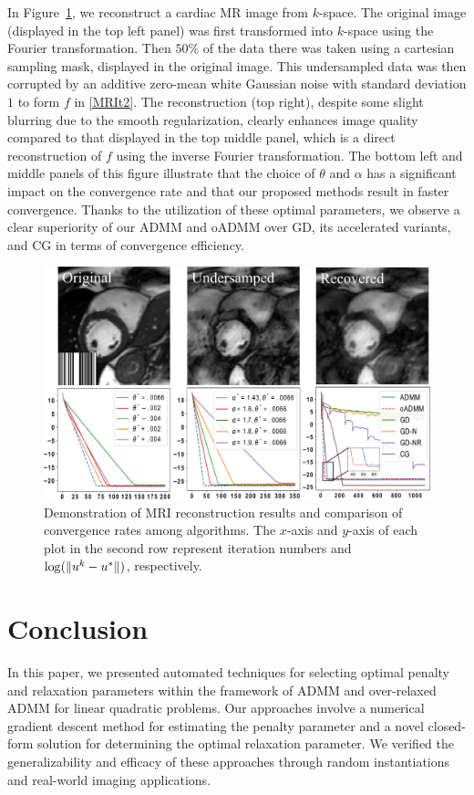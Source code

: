 \documentclass[letterpaper]{article} %
\begin{document}
In Figure~\ref{fig:MRI}, we reconstruct a cardiac MR image from $k$-space. The original image (displayed in the top left panel) was first transformed into $k$-space using the Fourier transformation. Then $50\%$ of the data there was taken using a cartesian sampling mask, displayed in the original image. This undersampled data was then corrupted by an additive zero-mean white Gaussian noise with standard deviation $1$ to form $f$ in \eqref{MRIt2}. The reconstruction (top right), despite some slight blurring due to the smooth regularization, clearly enhances image quality compared to that displayed in the top middle panel, which is a direct reconstruction of $f$ using the inverse Fourier transformation. The bottom left and middle panels of this figure illustrate that the choice of $\theta$ and $\alpha$ has a significant impact on the convergence rate and that our proposed methods result in faster convergence. Thanks to the utilization of these optimal parameters, we observe a clear superiority of our ADMM and oADMM over GD, its accelerated variants, and CG in terms of convergence efficiency.

\begin{figure}[t]
\centering
\includegraphics[width=0.97\linewidth]{Figures/n12.pdf}
\caption{{Demonstration of MRI reconstruction results and comparison of convergence rates among algorithms. The $x$-axis and $y$-axis of each plot in the second row represent iteration numbers and ${\rm{log}}(\|u^k - u^*\|)$, respectively.} }
\label{fig:MRI}
\end{figure}

\section{Conclusion}
In this paper, we presented automated techniques for selecting optimal penalty and relaxation parameters within the framework of ADMM and over-relaxed ADMM for linear quadratic problems. Our approaches involve a numerical gradient descent method for estimating the penalty parameter and a novel closed-form solution for determining the optimal relaxation parameter. We verified the generalizability and efficacy of these approaches through random instantiations and real-world imaging applications.
\end{document}
